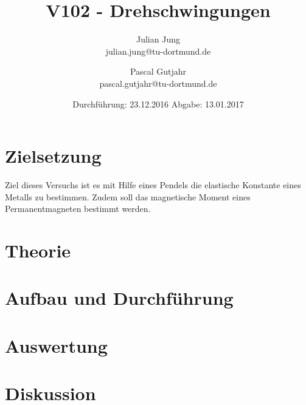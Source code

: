 

\title{V102 - Drehschwingungen}
\author{Julian Jung \\ julian.jung@tu-dortmund.de
  \and Pascal Gutjahr \\ pascal.gutjahr@tu-dortmund.de}
  \date{Durchführung: 23.12.2016
  \hspace{3em}
  Abgabe: 13.01.2017}
  
\maketitle
\newpage
\tableofcontents
\newpage
\section{Zielsetzung}
Ziel dieses Versuchs ist es mit Hilfe eines Pendels die elastische Konstante
eines Metalls zu bestimmen. Zudem soll das magnetische Moment eines
Permanentmagneten bestimmt werden.
\section{Theorie}
 
\section{Aufbau und Durchführung}
 
\section{Auswertung}
 
\section{Diskussion}
 
\printbibliography

